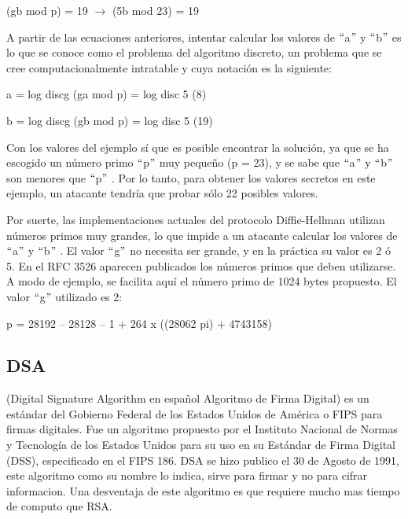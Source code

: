 \documentclass[12pt]{article}
\begin{document}
(gb mod p) = 19 $ \rightarrow $  (5b mod 23) = 19\par


\vspace{\baselineskip}
A partir de las ecuaciones anteriores, intentar calcular los valores de $``$a$"$  y $``$b$"$  es lo que se conoce como el problema del algoritmo discreto, un problema que se cree computacionalmente intratable y cuya notación es la siguiente:\par


\vspace{\baselineskip}
a = log discg (ga mod p) = log disc 5 (8)\par

b = log discg (gb mod p) = log disc 5 (19)\par


\vspace{\baselineskip}
Con los valores del ejemplo sí que es posible encontrar la solución, ya que se ha escogido un número primo $``$p$"$  muy pequeño (p = 23), y se sabe que $``$a$"$  y $``$b$"$  son menores que $``$p$"$ . Por lo tanto, para obtener los valores secretos en este ejemplo, un atacante tendría que probar sólo 22 posibles valores.\par


\vspace{\baselineskip}
Por suerte, las implementaciones actuales del protocolo Diffie-Hellman utilizan números primos muy grandes, lo que impide a un atacante calcular los valores de $``$a$"$  y $``$b$"$ . El valor $``$g$"$  no necesita ser grande, y en la práctica su valor es 2 ó 5. En el RFC 3526 aparecen publicados los números primos que deben utilizarse. A modo de ejemplo, se facilita aquí el número primo de 1024 bytes propuesto. El valor $``$g$"$  utilizado es 2:\par


\vspace{\baselineskip}
p = 28192 – 28128 – 1 + 264 x ((28062 pi) + 4743158)\par

\subsection{DSA}
(Digital Signature Algorithm en español Algoritmo de Firma Digital) es un estándar del Gobierno Federal de los Estados Unidos de América o FIPS para firmas digitales. Fue un algoritmo propuesto por el Instituto Nacional de Normas y Tecnología de los Estados Unidos para su uso en su Estándar de Firma Digital (DSS), especificado en el FIPS 186. DSA se hizo publico el 30 de Agosto de 1991, este algoritmo como su nombre lo indica, sirve para firmar y no para cifrar informacion. Una desventaja de este algoritmo es que requiere mucho mas tiempo de computo que RSA.\par
\end{document}
